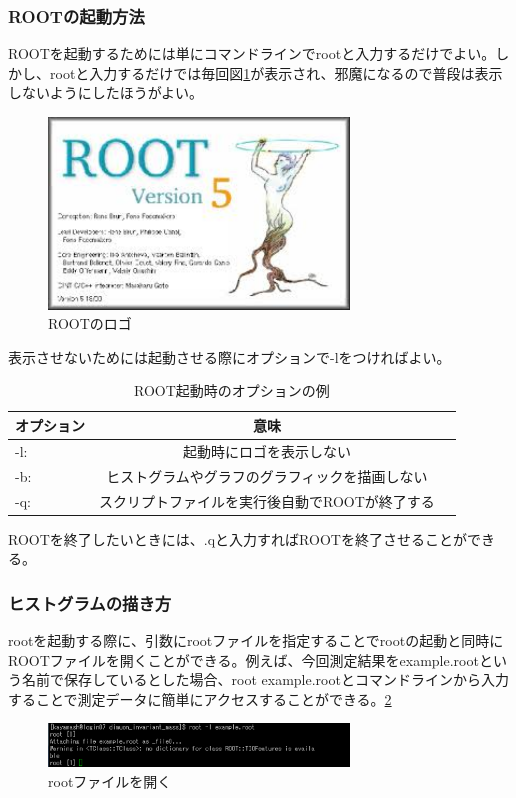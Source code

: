 \documentclass[10pt]{ujarticle}
\begin{document}
\subsubsection{ROOTの起動方法}
ROOTを起動するためには単にコマンドラインでrootと入力するだけでよい。しかし、rootと入力するだけでは毎回図\ref{fig:ROOT_logo}が表示され、邪魔になるので普段は表示しないようにしたほうがよい。
\begin{figure}[h]
\begin{center}
\includegraphics[width=8cm]{ROOT_logo.png}
\caption{ROOTのロゴ}
\label{fig:ROOT_logo}
\end{center}
\end{figure}
表示させないためには起動させる際にオプションで-lをつければよい。
\begin{table}[hbtp]
  \caption{ROOT起動時のオプションの例}
  \centering
  \begin{tabular}{lcr}
    \hline
    オプション  & 意味 \\
    \hline \hline
      -l:  & 起動時にロゴを表示しない  \\
      -b:  & ヒストグラムやグラフのグラフィックを描画しない \\
      -q:  & スクリプトファイルを実行後自動でROOTが終了する \\
    \hline
  \end{tabular}
\end{table}
ROOTを終了したいときには、.qと入力すればROOTを終了させることができる。

\subsubsection{ヒストグラムの描き方}
rootを起動する際に、引数にrootファイルを指定することでrootの起動と同時にROOTファイルを開くことができる。例えば、今回測定結果をexample.rootという名前で保存しているとした場合、root example.rootとコマンドラインから入力することで測定データに簡単にアクセスすることができる。\ref{fig:open_ROOT}
\begin{figure}[h]
\begin{center}
\includegraphics[width=8cm]{SummerChallenge_open_root.png}
\caption{rootファイルを開く}
\label{fig:open_ROOT}
\end{center}
\end{figure}
\end{document}
